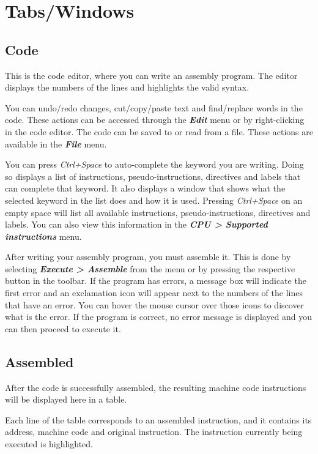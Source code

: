 \documentclass[11pt,a4paper,twoside,titlepage]{report}
\newcommand{\menupath}[1]{\textbf{\emph{#1}}}
\begin{document}
\chapter{Tabs/Windows} \label{ch:tabs_windows}

\section{Code}

This is the code editor, where you can write an assembly program.
The editor displays the numbers of the lines and highlights the valid syntax.

You can undo/redo changes, cut/copy/paste text and find/replace words in the
code. These actions can be accessed through the \menupath{Edit} menu or by
right-clicking in the code editor.
The code can be saved to or read from a file. These actions are available in
the \menupath{File} menu.

You can press \emph{Ctrl+Space} to auto-complete the keyword you are writing.
Doing so displays a list of instructions, pseudo-instructions, directives and
labels that can complete that keyword.
It also displays a window that shows what the selected keyword in the list does
and how it is used.
Pressing \emph{Ctrl+Space} on an empty space will list all available
instructions, pseudo-instructions, directives and labels.
You can also view this information in the 
\menupath{CPU > Supported instructions} menu.

After writing your assembly program, you must assemble it.
This is done by selecting \menupath{Execute > Assemble} from the menu or by
pressing the respective button in the toolbar.
If the program has errors, a message box will indicate the first error and an
exclamation icon will appear next to the numbers of the lines that have an
error.
You can hover the mouse cursor over those icons to discover what is the error.
If the program is correct, no error message is displayed and you can then
proceed to execute it.


\section{Assembled} \label{sec:assembled}

After the code is successfully assembled, the resulting machine code 
instructions will be displayed here in a table.

Each line of the table corresponds to an assembled instruction, and it
contains its address, machine code and original instruction.
The instruction currently being executed is highlighted.
\end{document}
